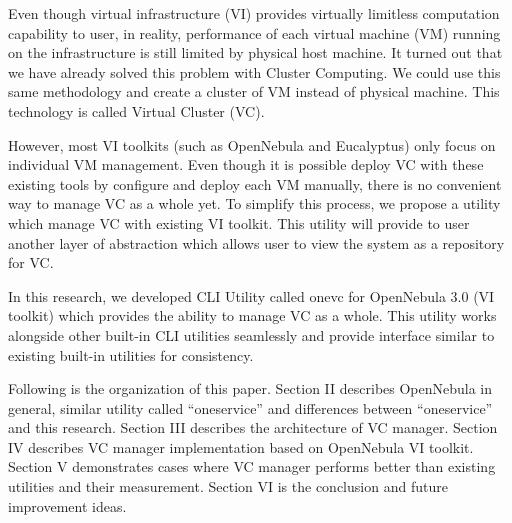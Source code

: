 \documentclass[conference]{IEEEtran}
\begin{document}
Even though virtual infrastructure (VI) provides virtually limitless computation capability to user, in reality, performance of each virtual machine (VM) running on the infrastructure is still limited by physical host machine.
It turned out that we have already solved this problem with Cluster Computing.
We could use this same methodology and create a cluster of VM instead of physical machine.
This technology is called Virtual Cluster\cite{1630864} (VC).

However, most VI toolkits (such as OpenNebula\cite{10.1109/MIC.2009.119} and Eucalyptus\cite{nurmi2009eucalyptus}) only focus on individual VM management.
Even though it is possible deploy VC with these existing tools by configure and deploy each VM manually, there is no convenient way to manage VC as a whole yet.
To simplify this process, we propose a utility which manage VC with existing VI toolkit.
This utility will provide to user another layer of abstraction which allows user to view the system as a repository for VC.

In this research, we developed CLI Utility called onevc for OpenNebula 3.0 (VI toolkit) which provides the ability to manage VC as a whole.
This utility works alongside other built-in CLI utilities seamlessly and provide interface similar to existing built-in utilities for consistency.

Following is the organization of this paper.
Section II describes OpenNebula in general, similar utility called ``oneservice'' and differences between ``oneservice'' and this research.
Section III describes the architecture of VC manager.
Section IV describes VC manager implementation based on OpenNebula VI toolkit.
Section V demonstrates cases where VC manager performs better than existing utilities and their measurement.
Section VI is the conclusion and future improvement ideas.



%
%
\end{document}

